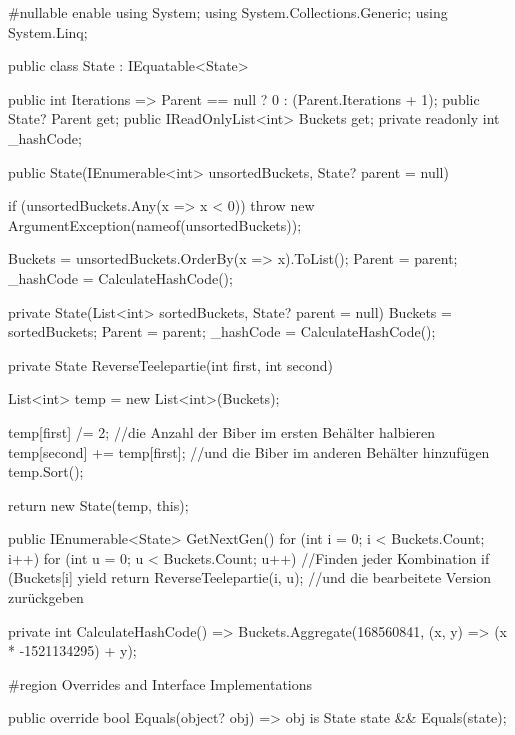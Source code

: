 \documentclass[a4paper,10pt,ngerman]{scrartcl}
\begin{document}
\begin{lstcs}
#nullable enable 
    using System;
    using System.Collections.Generic;
    using System.Linq;

    public class State : IEquatable<State>
    {
        public int Iterations => Parent == null ? 0 : (Parent.Iterations + 1);
        public State? Parent { get; }
        public IReadOnlyList<int> Buckets { get; }
        private readonly int _hashCode;

        public State(IEnumerable<int> unsortedBuckets, State? parent = null)
        {
            if (unsortedBuckets.Any(x => x < 0)) throw new ArgumentException(nameof(unsortedBuckets));

            Buckets = unsortedBuckets.OrderBy(x => x).ToList();
            Parent = parent;
            _hashCode = CalculateHashCode();
        }

        private State(List<int> sortedBuckets, State? parent = null)
        {
            Buckets = sortedBuckets;
            Parent = parent;
            _hashCode = CalculateHashCode();
        }

        private State ReverseTeelepartie(int first, int second)
        {
            List<int> temp = new List<int>(Buckets);

            temp[first] /= 2;               //die Anzahl der Biber im ersten Behälter halbieren
            temp[second] += temp[first];    //und die Biber im anderen Behälter hinzufügen
            temp.Sort();

            return new State(temp, this);
        }

        public IEnumerable<State> GetNextGen()
        {
            for (int i = 0; i < Buckets.Count; i++)
            {
                for (int u = 0; u < Buckets.Count; u++) //Finden jeder Kombination
                {
                    if (Buckets[i] %
                    {
                        yield return ReverseTeelepartie(i, u);  //und die bearbeitete Version zurückgeben
                    }
                }
            }
        }

        private int CalculateHashCode() =>
            Buckets.Aggregate(168560841, (x, y) => (x * -1521134295) + y);

        #region Overrides and Interface Implementations

        public override bool Equals(object? obj) => obj is State state && Equals(state);

}
\end{lstcs}
\end{document}
